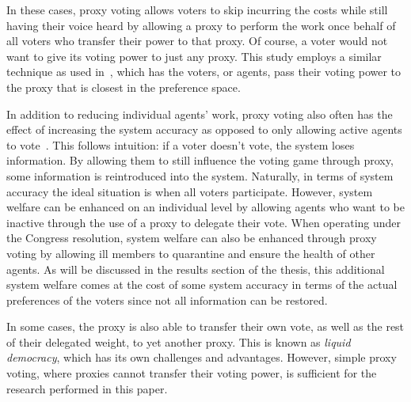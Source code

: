 In these cases, proxy voting allows voters to skip incurring the costs while
still having their voice heard by allowing a proxy to perform the work once  
behalf of all voters who transfer their power to that proxy.
Of course, a voter would not want to give its voting power to just any proxy.
This study employs a similar technique as used in~\cite{Cohensius2017}, which has the
voters, or agents, pass their voting power to the proxy that is closest in the
preference space.

In addition to reducing individual agents' work, proxy voting also often has
the effect of increasing the system accuracy as opposed to only allowing active
agents to vote~\cite{Cohensius2017}.
This follows intuition: if a voter doesn't vote, the system loses information.
By allowing them to still influence the voting game through proxy, some information
is reintroduced into the system.
Naturally, in terms of system accuracy the ideal situation is when all voters
participate.
However, system welfare can be enhanced on an individual level by allowing agents
who want to be inactive through the use of a proxy to delegate their vote.
When operating under the Congress resolution, system welfare can also be enhanced
through proxy voting by allowing ill members to quarantine and ensure the health
of other agents.
As will be discussed in the results section of the thesis,
this additional system welfare comes at
the cost of some system accuracy in terms of the actual preferences of the voters
since not all information can be restored.  

In some cases, the proxy is also able to transfer their own vote, as well as the rest of
their delegated weight, to yet another proxy.
This is known as \textit{liquid democracy}, which has its own challenges and
advantages.
However, simple proxy voting, where proxies cannot transfer their voting power,
is sufficient for the research performed in this paper.


